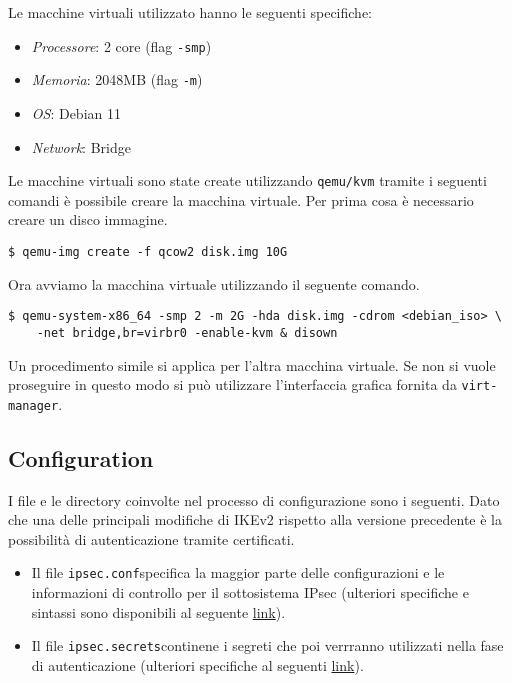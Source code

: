 \documentclass[
10pt, %
a4paper, %
oneside, %
headinclude,footinclude, %
BCOR5mm, %
]{scrartcl}
\begin{document}
\noindent
Le macchine virtuali utilizzato hanno le seguenti specifiche:

\begin{itemize}
    \item \textit{Processore}: 2 core (flag \lstinline|-smp|)
    \item \textit{Memoria}: 2048MB (flag \lstinline|-m|)
    \item \textit{OS}: Debian 11
    \item \textit{Network}: Bridge
\end{itemize}

\noindent
Le macchine virtuali sono state create utilizzando \lstinline|qemu/kvm| tramite i seguenti comandi è possibile creare la macchina virtuale.
\newline\newline\noindent
Per prima cosa è necessario creare un disco immagine.
\begin{lstlisting}
$ qemu-img create -f qcow2 disk.img 10G 
\end{lstlisting}
\vspace*{0.2cm}
Ora avviamo la macchina virtuale utilizzando il seguente comando.
\begin{lstlisting}
$ qemu-system-x86_64 -smp 2 -m 2G -hda disk.img -cdrom <debian_iso> \
    -net bridge,br=virbr0 -enable-kvm & disown
\end{lstlisting}

\vspace*{0.5cm}
\noindent
Un procedimento simile si applica per l'altra macchina virtuale. Se non si vuole proseguire in questo modo 
si può utilizzare l'interfaccia grafica fornita da \lstinline|virt-manager|.



\subsection{Configuration} 

I file e le directory coinvolte nel processo di configurazione sono i seguenti. Dato che una delle principali modifiche di IKEv2 
rispetto alla versione precedente è la possibilità di autenticazione tramite certificati.
\\

    
\begin{itemize}
    \item Il file \lstinline|ipsec.conf|\footnotemark[1] specifica la maggior parte delle configurazioni e le informazioni di controllo per il sottosistema IPsec (ulteriori specifiche e sintassi sono disponibili al seguente \href{https://linux.die.net/man/5/ipsec.conf}{link}).
    \item Il file \lstinline|ipsec.secrets|\footnotemark[1] continene i segreti che poi verrranno utilizzati nella fase di autenticazione (ulteriori specifiche al seguenti \href{https://linux.die.net/man/5/ipsec.secrets}{link}).
\end{itemize}
\end{document}
